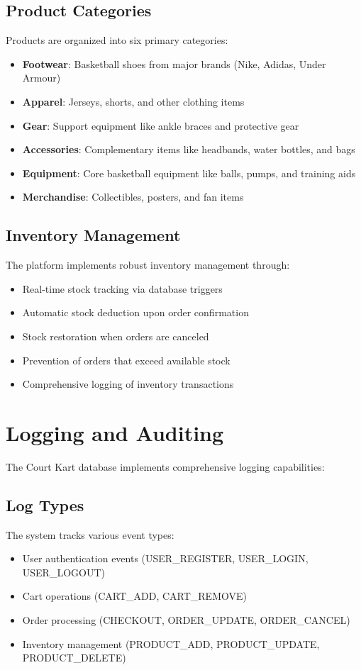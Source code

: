\documentclass[13pt,a4paper]{article}
\begin{document}
\subsection{Product Categories}
Products are organized into six primary categories:
\begin{itemize}
	\item \textbf{Footwear}: Basketball shoes from major brands (Nike, Adidas, Under Armour)
	\item \textbf{Apparel}: Jerseys, shorts, and other clothing items
	\item \textbf{Gear}: Support equipment like ankle braces and protective gear
	\item \textbf{Accessories}: Complementary items like headbands, water bottles, and bags
	\item \textbf{Equipment}: Core basketball equipment like balls, pumps, and training aids
	\item \textbf{Merchandise}: Collectibles, posters, and fan items
\end{itemize}

\subsection{Inventory Management}
The platform implements robust inventory management through:
\begin{itemize}
	\item Real-time stock tracking via database triggers
	\item Automatic stock deduction upon order confirmation
	\item Stock restoration when orders are canceled
	\item Prevention of orders that exceed available stock
	\item Comprehensive logging of inventory transactions
\end{itemize}

\section{Logging and Auditing}

The Court Kart database implements comprehensive logging capabilities:

\subsection{Log Types}
The system tracks various event types:
\begin{itemize}
	\item User authentication events (USER\_REGISTER, USER\_LOGIN, USER\_LOGOUT)
	\item Cart operations (CART\_ADD, CART\_REMOVE)
	\item Order processing (CHECKOUT, ORDER\_UPDATE, ORDER\_CANCEL)
	\item Inventory management (PRODUCT\_ADD, PRODUCT\_UPDATE, PRODUCT\_DELETE)
\end{itemize}
\end{document}
